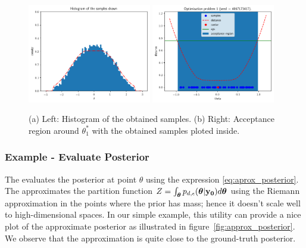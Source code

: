 \begin{figure}[h]
    \begin{center}
      \includegraphics[width=0.48\textwidth]{./Thesis/images/chapter3/example_marginal.png}
      \includegraphics[width=0.48\textwidth]{./Thesis/images/chapter3/example_region_samples.png}
    \end{center}
  \caption{(a) Left: Histogram of the obtained samples. (b) Right: Acceptance region around $\theta_1^*$ with the obtained samples ploted inside.}
  \label{fig:example_sampling}
\end{figure}

\subsubsection*{Example - Evaluate Posterior}

The  evaluates the
posterior at point $\theta$ using the expression
\eqref{eq:aprox_posterior}. The 
approximates the partition function
$Z = \int_{\boldsymbol{\theta}} p_{d,\epsilon}(\boldsymbol{\theta}|\mathbf{y_0}) d\boldsymbol{\theta}$ using the
Riemann approximation in the points where the prior has mass; hence it
doesn't scale well to high-dimensional spaces. In our simple example,
this utility can provide a nice plot of the approximate posterior as
illustrated in figure~\ref{fig:approx_posterior}. We observe that the
approximation is quite close to the ground-truth posterior.

